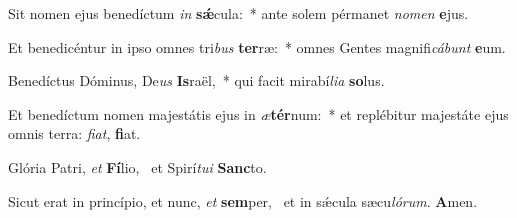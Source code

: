 \item Sit nomen ejus benedíctum \textit{in} \textbf{sǽ}cula:~* ante solem pérmanet \textit{no}\textit{men} \textbf{e}jus.
\item Et benedicéntur in ipso omnes tri\textit{bus} \textbf{ter}ræ:~* omnes Gentes magnifi\textit{cá}\textit{bunt} \textbf{e}um.
\item Benedíctus Dóminus, De\textit{us} \textbf{Is}raël,~* qui facit mirabí\textit{li}\textit{a} \textbf{so}lus.
\item Et benedíctum nomen majestátis ejus in \textit{æ}\textbf{tér}num:~* et replébitur majestáte ejus omnis terra: \textit{fi}\textit{at}, \textbf{fi}at.
\item Glória Patri, \textit{et} \textbf{Fí}lio,~\psstar{} et Spirí\textit{tu}\textit{i} \textbf{Sanc}to.
\item Sicut erat in princípio, et nunc, \textit{et} \textbf{sem}per,~\psstar{} et in sǽcula sæcu\textit{ló}\textit{rum}. \textbf{A}men.